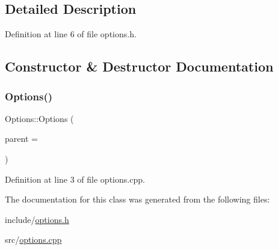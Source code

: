 \subsection{Detailed Description}


Definition at line 6 of file options.\+h.



\subsection{Constructor \& Destructor Documentation}
\mbox{\label{class_options_a87403ad1d6bd9ae2b54af860bb0f0952}} 
\subsubsection{\texorpdfstring{Options()}{Options()}}
{\footnotesize\ttfamily Options\+::\+Options (\begin{DoxyParamCaption}\item[{Q\+Widget $\ast$}]{parent = {} }\end{DoxyParamCaption})\hspace{0.3cm}{\ttfamily [explicit]}}



Definition at line 3 of file options.\+cpp.



The documentation for this class was generated from the following files\+:\begin{DoxyCompactItemize}
\item 
include/\mbox{\hyperlink{options_8h}{options.\+h}}\item 
src/\mbox{\hyperlink{options_8cpp}{options.\+cpp}}\end{DoxyCompactItemize}
